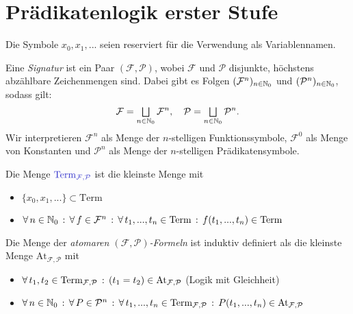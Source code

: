 \documentclass{cheat-sheet}
\newcommand{\At}{\mathrm{At}} %
\newcommand{\Term}{\mathrm{Term}} %
\begin{document}

\section{Prädikatenlogik erster Stufe}


\begin{nota}
  Die Symbole $x_0, x_1, ...$ seien reserviert für die Verwendung als Variablennamen.
\end{nota}

\begin{defn}
  Eine \emph{Signatur} ist ein Paar $(\mathcal{F}, \mathcal{P})$, wobei $\mathcal{F}$ und $\mathcal{P}$ disjunkte, höchstens abzählbare Zeichenmengen sind. Dabei gibt es Folgen $(\mathcal{F}^n)_{n \in \mathbb{N}_0}$ und $(\mathcal{P}^n)_{n \in \mathbb{N}_0}$, sodass gilt:
  \[
    \mathcal{F} = \bigsqcup_{n \in \N_0} \mathcal{F}^n, \quad
    \mathcal{P} = \bigsqcup_{n \in \N_0} \mathcal{P}^n.
  \]
  Wir interpretieren $\mathcal{F}^n$ als Menge der $n$-stelligen Funktionssymbole, $\mathcal{F}^0$ als Menge von Konstanten und $\mathcal{P}^n$ als Menge der $n$-stelligen Prädikatensymbole.
\end{defn}

\begin{defn}
  Die Menge $\emph{\Term_{\mathcal{F}, \mathcal{P}}}$ ist die kleinste Menge mit
  \begin{itemize}
    \item $\{ x_0, x_1, ... \} \subset \Term$
    \item $\fa{n \in \N_0} \fa{f \in \mathcal{F}^n} \fa{t_1, ..., t_n \in \Term} f(t_1, ..., t_n) \in \Term$
  \end{itemize}
\end{defn}

\begin{defn}
  Die Menge der \emph{atomaren $(\mathcal{F}, \mathcal{P})$-Formeln} ist induktiv definiert als die kleinste Menge $\At_{\mathcal{F},\mathcal{P}}$ mit
  \begin{itemize}
    \item $\fa{t_1, t_2 \in \Term_{\mathcal{F},\mathcal{P}}} (t_1 = t_2) \in \At_{\mathcal{F},\mathcal{P}}$ \enspace (Logik mit Gleichheit)
    \item $\fa{n \in \N_0} \fa{P \in \mathcal{P}^n} \fa{t_1, ..., t_n \in \Term_{\mathcal{F},\mathcal{P}}} P(t_1, ..., t_n) \in \At_{\mathcal{F},\mathcal{P}}$
  \end{itemize}
\end{defn}
\end{document}
